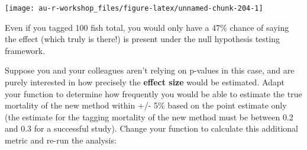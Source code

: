\documentclass[]{book}
\theoremstyle{definition}
\theoremstyle{definition}
\theoremstyle{definition}
\theoremstyle{remark}
\begin{document}
\begin{center}\texttt{[image: au-r-workshop\_files/figure-latex/unnamed-chunk-204-1]} \end{center}

Even if you tagged 100 fish total, you would only have a 47\% chance of
saying the effect (which truly is there!) is present under the null
hypothesis testing framework.

Suppose you and your colleagues aren't relying on p-values in this case,
and are purely interested in how precisely the \textbf{effect size}
would be estimated. Adapt your function to determine how frequently you
would be able to estimate the true mortality of the new method within
+/- 5\% based on the point estimate only (the estimate for the tagging
mortality of the new method must be between 0.2 and 0.3 for a successful
study). Change your function to calculate this additional metric and
re-run the analysis:
\end{document}

